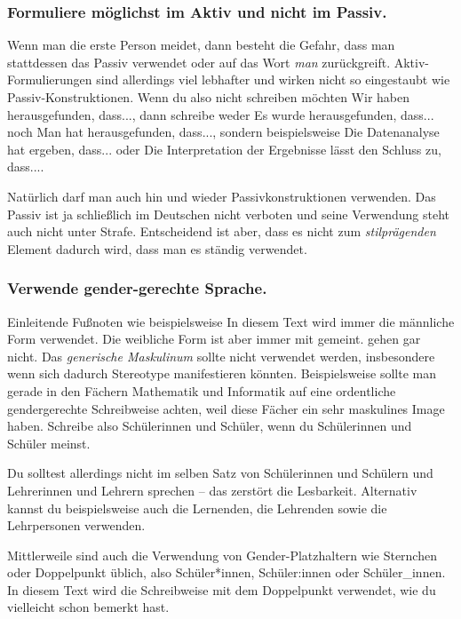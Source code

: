 \documentclass{../cssheet}
\begin{document}
\subsubsection*{Formuliere möglichst im Aktiv und nicht im Passiv.}

Wenn man die erste Person meidet, dann besteht die Gefahr, dass man
stattdessen das Passiv verwendet oder auf das Wort \emph{man} zurückgreift.
Aktiv-Formulierungen sind allerdings viel lebhafter und wirken nicht so
eingestaubt wie Passiv-Konstruktionen. Wenn du also
nicht schreiben möchten \glqq{}Wir haben herausgefunden, dass...\grqq{}, dann
schreibe weder \glqq{}Es wurde herausgefunden, dass...\grqq{} noch \glqq{}Man hat
herausgefunden, dass...\grqq{}, sondern beispielsweise \glqq{}Die Datenanalyse hat
ergeben, dass...\grqq{} oder \glqq{}Die Interpretation der Ergebnisse lässt den
Schluss zu, dass...\grqq{}.

Natürlich darf man auch hin und wieder Passivkonstruktionen verwenden.
Das Passiv ist ja schließlich im Deutschen nicht verboten und seine
Verwendung steht auch nicht unter Strafe. Entscheidend ist aber, dass es
nicht zum \emph{stilprägenden} Element dadurch wird, dass man es ständig
verwendet.

\subsubsection*{Verwende gender-gerechte Sprache.}

Einleitende Fußnoten wie beispielsweise \glqq{}In diesem Text wird immer die männliche Form verwendet. Die weibliche Form ist aber immer mit gemeint.\grqq{} gehen gar nicht. Das \emph{generische Maskulinum} sollte nicht verwendet werden, insbesondere wenn sich dadurch Stereotype manifestieren könnten. Beispielsweise sollte man gerade in den Fächern Mathematik und Informatik auf eine ordentliche gendergerechte Schreibweise achten, weil diese Fächer ein sehr maskulines Image haben. Schreibe also \glqq{}Schülerinnen und Schüler\grqq{}, wenn du Schülerinnen und Schüler meinst. 

Du solltest allerdings nicht im selben Satz von \glqq{}Schülerinnen und
Schülern und Lehrerinnen und Lehrern\grqq{} sprechen -- das zerstört die
Lesbarkeit. Alternativ kannst du beispielsweise auch \glqq{}die Lernenden\grqq{},
\glqq{}die Lehrenden\grqq{} sowie \glqq{}die Lehrpersonen\grqq{} verwenden.

Mittlerweile sind auch die Verwendung von Gender-Platzhaltern wie Sternchen oder Doppelpunkt üblich, also Schüler*innen, Schüler:innen oder Schüler\_innen. In diesem Text wird die Schreibweise mit dem Doppelpunkt verwendet, wie du vielleicht schon bemerkt hast.
\end{document}
